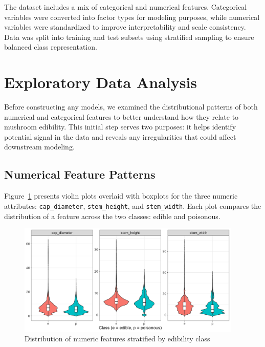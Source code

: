 \documentclass[a4paper,11pt]{article}
\begin{document}
The dataset includes a mix of categorical and numerical features. Categorical variables were converted into factor types for modeling purposes, while numerical variables were standardized to improve interpretability and scale consistency. Data was split into training and test subsets using stratified sampling to ensure balanced class representation.


\section{Exploratory Data Analysis}

Before constructing any models, we examined the distributional patterns of both numerical and categorical features to better understand how they relate to mushroom edibility. This initial step serves two purposes: it helps identify potential signal in the data and reveals any irregularities that could affect downstream modeling.

\subsection{Numerical Feature Patterns}

Figure~\ref{fig:violin} presents violin plots overlaid with boxplots for the three numeric attributes: \texttt{cap\_diameter}, \texttt{stem\_height}, and \texttt{stem\_width}. Each plot compares the distribution of a feature across the two classes: edible and poisonous.

\begin{figure}[h]
\centering
\includegraphics[width=0.95\textwidth]{Figure1-violin-plots.png}
\caption{Distribution of numeric features stratified by edibility class}
\label{fig:violin}
\end{figure}
\end{document}
